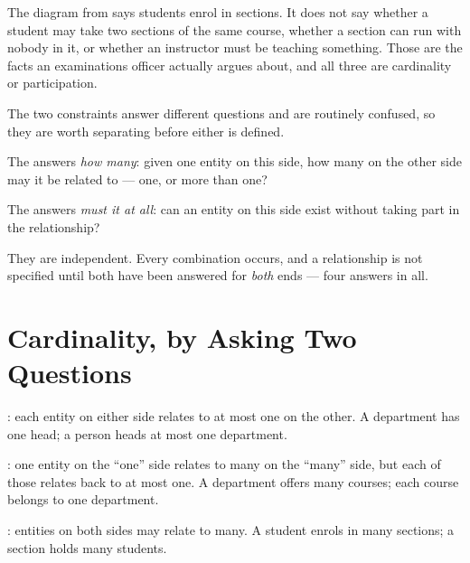 The diagram from  says students enrol in sections. It does not
say whether a student may take two sections of the same course, whether a
section can run with nobody in it, or whether an instructor must be teaching
something. Those are the facts an examinations officer actually argues about,
and all three are cardinality or participation.

The two constraints answer different questions and are routinely confused, so
they are worth separating before either is defined.

\begin{definitionbox}
The  answers \emph{how many}: given one entity on this
side, how many on the other side may it be related to --- one, or more than
one?

\smallskip
The  answers \emph{must it at all}: can an
entity on this side exist without taking part in the relationship?

\smallskip
They are independent. Every combination occurs, and a relationship is not
specified until both have been answered for \emph{both} ends --- four answers
in all.
\end{definitionbox}

\section{Cardinality, by Asking Two Questions}

\begin{definitionbox}
: each entity on either side relates to at most one on
the other. A department has one head; a person heads at most one department.

\smallskip
{}: one entity on the ``one'' side relates to many on
the ``many'' side, but each of those relates back to at most one. A department
offers many courses; each course belongs to one department.

\smallskip
{}: entities on both sides may relate to many. A student
enrols in many sections; a section holds many students.
\end{definitionbox}

